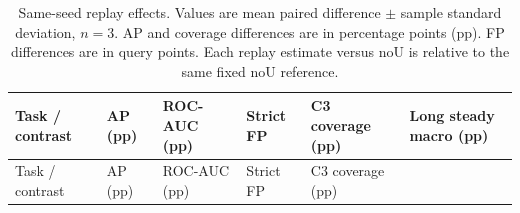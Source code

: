 \documentclass[pdflatex,sn-apa]{sn-jnl}
\begin{document}
\begin{longtable}[]{@{}
  >{\raggedright\arraybackslash}p{}
  >{\raggedleft\arraybackslash}p{}
  >{\raggedleft\arraybackslash}p{}
  >{\raggedleft\arraybackslash}p{}
  >{\raggedleft\arraybackslash}p{}
  >{\raggedleft\arraybackslash}p{}@{}}
\caption{Same-seed replay effects. Values are mean paired difference \ensuremath{\pm}
sample standard deviation, \(n=3\). AP and coverage differences are in
percentage points (pp). FP differences are in query points. Each replay
estimate versus noU is relative to the same fixed noU
reference.}\tabularnewline
\toprule\noalign{}
\begin{minipage}[b]{\linewidth}\raggedright
Task / contrast
\end{minipage} & \begin{minipage}[b]{\linewidth}\raggedleft
AP (pp)
\end{minipage} & \begin{minipage}[b]{\linewidth}\raggedleft
ROC-AUC (pp)
\end{minipage} & \begin{minipage}[b]{\linewidth}\raggedleft
Strict FP
\end{minipage} & \begin{minipage}[b]{\linewidth}\raggedleft
C3 coverage (pp)
\end{minipage} & \begin{minipage}[b]{\linewidth}\raggedleft
Long steady macro (pp)
\end{minipage} \\
\midrule\noalign{}
\endfirsthead
\toprule\noalign{}
\begin{minipage}[b]{\linewidth}\raggedright
Task / contrast
\end{minipage} & \begin{minipage}[b]{\linewidth}\raggedleft
AP (pp)
\end{minipage} & \begin{minipage}[b]{\linewidth}\raggedleft
ROC-AUC (pp)
\end{minipage} & \begin{minipage}[b]{\linewidth}\raggedleft
Strict FP
\end{minipage} & \begin{minipage}[b]{\linewidth}\raggedleft
C3 coverage (pp)
\end{minipage} & \begin{minipage}[b]{\linewidth}\raggedleft

\end{minipage}
\end{longtable}
\end{document}
